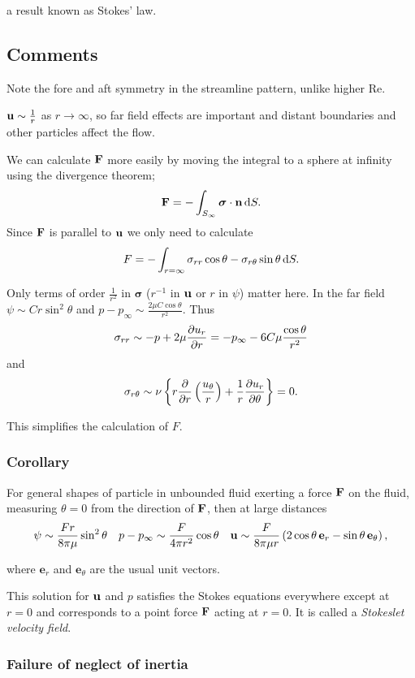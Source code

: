 \documentclass{notes}
\newcommand{\Rey}{\mathrm{Re}}
\newcommand{\bs}{\boldsymbol{\sigma}}
\newcommand{\e}{\mathbf{e}}
\theoremstyle{plain}
\begin{document}
a result known as Stokes' law.

\subsection{Comments}

Note the fore and aft symmetry in the streamline pattern, unlike higher
$\Rey$.
\vspace{1in}

$\mathbf{u} \sim \frac{1}{r}$ as $r \to \infty$, so far field effects are
important and distant boundaries and other particles affect the flow.

We can calculate $\mathbf{F}$ more easily by moving the integral to a
sphere at infinity using the divergence theorem;
\[
\vF = - \int_{S_\infty} \bs \cdot \vn\, \ud S.
\]
Since $\mathbf{F}$ is parallel to $\mathbf{u}$ we only need to calculate
\[
F = -\int_{r = \infty} \sigma_{rr} \cos \theta - \sigma_{r \theta}
\sin \theta\, \mathrm{d} S.
\]

Only terms of order $\frac{1}{r^2}$ in $\bs$ ($r^{-1}$ in $\mathbf{u}$ or
$r$ in $\psi$) matter here.  In the far field
$\psi \sim C r \sin^2 \theta$ and $p - p_\infty \sim
\frac{2 \mu C \cos \theta}{r^2}$.  Thus
\[
\sigma_{rr} \sim -p + 2 \mu \frac{\partial u_r}{\partial r} = -p_\infty - 6 C \mu
\frac{\cos \theta}{r^2}
\]
and
\[
\sigma_{r \theta} \sim \nu \left\{ r \frac{\partial }{\partial r} \left( \frac{u_\theta}{r}
\right) + \frac{1}{r} \frac{\partial u_r}{\partial \theta} \right\} = 0.
\]

This simplifies the calculation of $F$.

\subsubsection*{Corollary}

For general shapes of particle in unbounded fluid exerting a force
$\mathbf{F}$ on the fluid, measuring $\theta =0$ from the direction of
$\mathbf{F}$, then at large distances
\[
\psi \sim \frac{F r}{8 \pi \mu} \sin^2 \theta \quad
p - p_\infty \sim \frac{F}{4 \pi r^2} \cos \theta \quad
\vu \sim \frac{F}{8 \pi \mu r} \left( 2 \cos \theta\, \e_r -
\sin \theta\, \e_\theta \right),
\]

where $\e_r$ and $\e_\theta$ are the usual unit vectors.

This solution for $\mathbf{u}$ and $p$ satisfies the Stokes equations everywhere
except at $r = 0$ and corresponds to a point force $\mathbf{F}$ acting
at $r = 0$.  It is called a \emph{Stokeslet velocity field}.

\subsubsection*{Failure of neglect of inertia}
\end{document}
